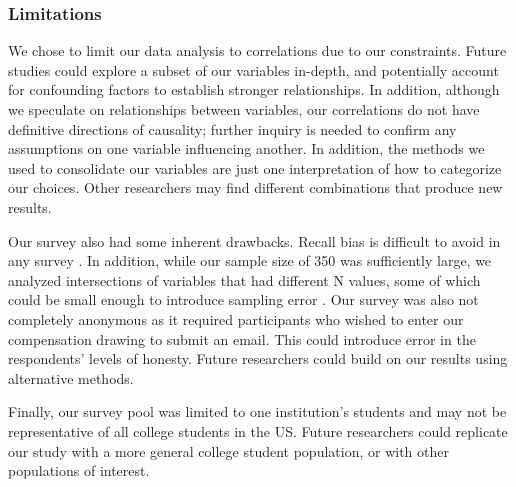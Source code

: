 \subsubsection{Limitations}

We chose to limit our data
analysis to correlations due to our constraints. Future studies could explore
a subset of our variables in-depth, and potentially account for confounding
factors to establish stronger relationships. In addition, although we
speculate on relationships between variables, our correlations do not have
definitive directions of causality; further inquiry is needed to confirm any
assumptions on one variable influencing another. In addition, the methods we
used to consolidate our variables are just one interpretation of how to
categorize our choices. Other researchers may find different combinations that
produce new results.

Our survey also had some inherent drawbacks. Recall bias is difficult to avoid
in any survey \cite{lazar_28}. In addition, while our sample size of 350 was sufficiently
large, we analyzed intersections of variables that had different N values,
some of which could be small enough to introduce sampling error \cite{lazar_28}. Our
survey was also not completely anonymous as it required participants who
wished to enter our compensation drawing to submit an email. This could
introduce error in the respondents' levels of honesty. Future researchers
could build on our results using alternative methods.

Finally, our survey pool was limited to one institution's students and may not be representative of all college students in the US. Future researchers could replicate our study
with a more general college student population, or with other populations of
interest.
